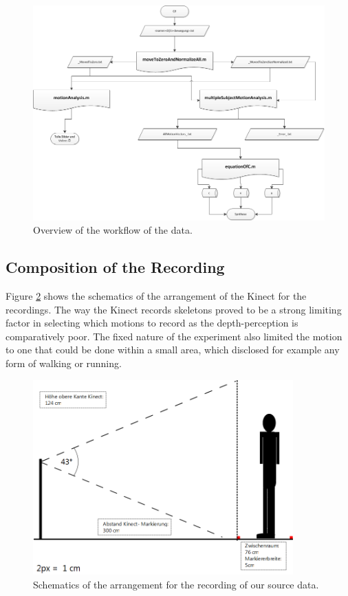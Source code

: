 \documentclass[a4paper]{article}
\begin{document}
\begin{figure}
	\centering
	\includegraphics[width=14cm]{matlabaufbau.png}
	\caption{Overview of the workflow of the data.}
	\label{fig:workflow}
\end{figure}

\subsection{Composition of the Recording}

Figure \ref{fig:schematic} shows the schematics of the arrangement of the Kinect for the recordings.
The way the Kinect records skeletons proved to be a strong limiting factor in selecting which motions to record as the depth-perception is comparatively poor.
The fixed nature of the experiment also limited the motion to one that could be done within a small area, which disclosed for example any form of walking or running.

\begin{figure}
	\centering
	\includegraphics[width=10cm]{Aufbauohnelizenz.png}
	\caption{Schematics of the arrangement for the recording of our source data.}
	\label{fig:schematic}
\end{figure}
\end{document}
